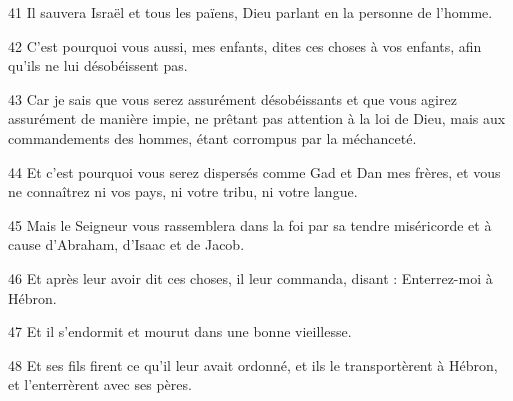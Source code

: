 \par 41 Il sauvera Israël et tous les païens, Dieu parlant en la personne de l'homme.

\par 42 C'est pourquoi vous aussi, mes enfants, dites ces choses à vos enfants, afin qu'ils ne lui désobéissent pas.

\par 43 Car je sais que vous serez assurément désobéissants et que vous agirez assurément de manière impie, ne prêtant pas attention à la loi de Dieu, mais aux commandements des hommes, étant corrompus par la méchanceté.

\par 44 Et c'est pourquoi vous serez dispersés comme Gad et Dan mes frères, et vous ne connaîtrez ni vos pays, ni votre tribu, ni votre langue.

\par 45 Mais le Seigneur vous rassemblera dans la foi par sa tendre miséricorde et à cause d'Abraham, d'Isaac et de Jacob.

\par 46 Et après leur avoir dit ces choses, il leur commanda, disant : Enterrez-moi à Hébron.

\par 47 Et il s'endormit et mourut dans une bonne vieillesse.

\par 48 Et ses fils firent ce qu'il leur avait ordonné, et ils le transportèrent à Hébron, et l'enterrèrent avec ses pères.


